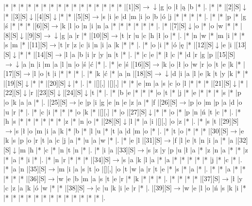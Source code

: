 \documentclass[11pt]{article}
\newcommand\drarr{$\rightarrow \!\!\!\!\! \downarrow$}
\newcommand\rarr{$\rightarrow$}
\newcommand\darr{$\downarrow$}
\begin{document}
\noindent\begin{Puzzle}{22}{22}|*	|*	|*	|*	|*	|*	|*	|*	|*	|*	|*	|*	|*	|*	|*	|*	|[1][S]\drarr	|g	|o	|ł	|ą	|b	|*	|.
|*	|*	|[2][S]\darr	|*	|[3][S]\darr	|[4][S]\darr	|*	|*	|[5][S]\rarr	|s	|i	|e	|d	|m	|i	|o	|b	|ó	|j	|*	|*	|*	|*	|.
|*	|*	|p	|*	|g	|ś	|*	|*	|*	|[6][S]\rarr	|k	|l	|o	|n	|i	|n	|a	|*	|*	|*	|*	|*	|*	|.
|*	|[7][S]\darr	|o	|*	|o	|w	|*	|*	|[8][S]\darr	|[9][S]\drarr	|g	|a	|r	|*	|[10][S]\rarr	|t	|r	|u	|c	|h	|ł	|o	|*	|.
|*	|n	|w	|*	|m	|i	|*	|*	|s	|m	|*	|[11][S]\rarr	|t	|r	|z	|c	|i	|n	|i	|a	|k	|*	|*	|.
|*	|o	|i	|*	|ó	|ę	|*	|[12][S]\darr	|e	|i	|[13][S]\darr	|*	|*	|[14][S]\rarr	|l	|a	|b	|i	|r	|y	|n	|t	|*	|.
|*	|c	|e	|*	|ł	|c	|*	|d	|r	|g	|p	|[15][S]\drarr	|a	|n	|i	|m	|a	|l	|n	|o	|ś	|ć	|*	|.
|*	|e	|ś	|[16][S]\rarr	|k	|o	|ł	|o	|w	|r	|o	|t	|e	|k	|*	|[17][S]\rarr	|l	|o	|t	|i	|*	|*	|*	|.
|*	|k	|ć	|*	|a	|n	|[18][S]\drarr	|d	|i	|a	|l	|e	|k	|t	|y	|k	|*	|*	|[19][S]\darr	|*	|*	|[20][S]\darr	|*	|.
|*	|[][,]{ }	|[][,]{ }	|*	|*	|e	|m	|a	|s	|c	|o	|l	|*	|*	|*	|[21][S]\darr	|*	|[22][S]\darr	|r	|[23][S]\darr	|[24][S]\darr	|t	|*	|.
|*	|b	|e	|*	|*	|*	|o	|t	|*	|j	|*	|e	|*	|*	|*	|s	|*	|p	|o	|k	|a	|a	|*	|.
|[25][S]\rarr	|e	|p	|i	|g	|e	|n	|e	|z	|a	|*	|f	|[26][S]\rarr	|p	|o	|m	|p	|a	|d	|o	|u	|r	|*	|.
|*	|c	|i	|*	|*	|*	|o	|k	|*	|[][,]{ }	|*	|o	|[27][S]\darr	|*	|*	|o	|*	|p	|n	|ń	|t	|c	|*	|.
|*	|h	|s	|*	|*	|*	|*	|*	|*	|z	|*	|n	|o	|*	|[28][S]\darr	|l	|*	|a	|i	|[][,]{ }	|o	|z	|*	|.
|*	|s	|t	|[29][S]\rarr	|s	|ł	|o	|m	|i	|a	|k	|*	|b	|*	|l	|u	|*	|t	|a	|d	|m	|o	|*	|.
|*	|t	|o	|*	|*	|*	|[30][S]\rarr	|e	|k	|s	|p	|o	|r	|t	|a	|c	|j	|a	|*	|u	|a	|w	|*	|.
|*	|e	|l	|[31][S]\rarr	|f	|l	|e	|t	|n	|i	|a	|*	|a	|[32][S]\darr	|m	|h	|*	|c	|*	|n	|t	|n	|*	|.
|*	|i	|a	|[33][S]\rarr	|s	|z	|y	|p	|u	|ł	|a	|*	|z	|n	|a	|*	|*	|z	|*	|a	|*	|i	|*	|.
|*	|n	|r	|*	|*	|*	|[34][S]\rarr	|s	|a	|k	|l	|a	|*	|a	|*	|*	|*	|*	|*	|j	|*	|c	|*	|.
|*	|a	|n	|[35][S]\rarr	|m	|i	|a	|s	|t	|o	|[][,]{ }	|o	|t	|w	|a	|r	|t	|e	|*	|s	|*	|a	|*	|.
|*	|*	|a	|*	|*	|*	|*	|*	|[36][S]\rarr	|w	|e	|b	|m	|a	|s	|t	|e	|r	|*	|k	|*	|*	|*	|.
|*	|*	|*	|*	|[37][S]\rarr	|ł	|y	|c	|z	|a	|k	|ó	|w	|*	|*	|[38][S]\rarr	|c	|u	|k	|i	|e	|r	|*	|.
|[39][S]\rarr	|w	|e	|l	|o	|ń	|s	|k	|i	|*	|*	|*	|*	|*	|*	|*	|*	|*	|*	|*	|*	|*	|*	|.\end{Puzzle}

\newpage
\end{document}

